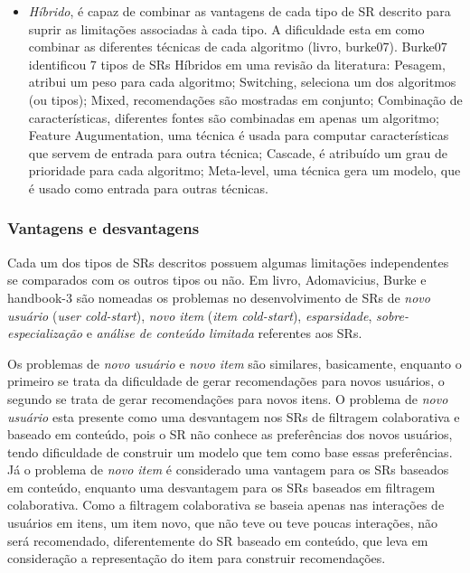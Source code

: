 \documentclass[normaltoc, espacoumemeio, pnumromarab,ruledheader]{abnt}
\begin{document}
\begin{itemize}
 \item \textit{Híbrido}, é capaz de combinar as vantagens de cada tipo de SR descrito para suprir as limitações associadas à cada tipo. A dificuldade esta em como combinar as diferentes técnicas de cada algoritmo (livro, burke07). Burke07 identificou 7 tipos de SRs Híbridos em uma revisão da literatura: Pesagem, atribui um peso para cada algoritmo; Switching, seleciona um dos algoritmos (ou tipos); Mixed, recomendações são mostradas em conjunto; Combinação de características, diferentes fontes são combinadas em apenas um algoritmo; Feature Augumentation, uma técnica é usada para computar características que servem de entrada para outra técnica; Cascade, é atribuído um grau de prioridade para cada algoritmo; Meta-level, uma técnica gera um modelo, que é usado como entrada para outras técnicas.
\end{itemize}

 \subsubsection{Vantagens e desvantagens}
 \label{sec:lim}

Cada um dos tipos de SRs descritos possuem algumas limitações independentes se comparados com os outros tipos ou não.
Em livro, Adomavicius, Burke e handbook-3 são nomeadas os problemas no desenvolvimento de SRs de \textit{novo usuário} (\textit{user cold-start}), \textit{novo item} (\textit{item cold-start}), \textit{esparsidade}, \textit{sobre-especialização} e \textit{análise de conteúdo limitada} referentes aos SRs.

Os problemas de \textit{novo usuário} e \textit{novo item} são similares, basicamente, enquanto o primeiro se trata da dificuldade de gerar recomendações para novos usuários, o segundo se trata de gerar recomendações para novos itens.
O problema de \textit{novo usuário} esta presente como uma desvantagem nos SRs de filtragem colaborativa e baseado em conteúdo, pois o SR não conhece as preferências dos novos usuários, tendo dificuldade de construir um modelo que tem como base essas preferências.
Já o problema de \textit{novo item} é considerado uma vantagem para os SRs baseados em conteúdo, enquanto uma desvantagem para os SRs baseados em filtragem colaborativa.
Como a filtragem colaborativa se baseia apenas nas interações de usuários em itens, um item novo, que não teve ou teve poucas interações, não será recomendado, diferentemente do SR baseado em conteúdo, que leva em consideração a representação do item para construir recomendações.
\end{document}
